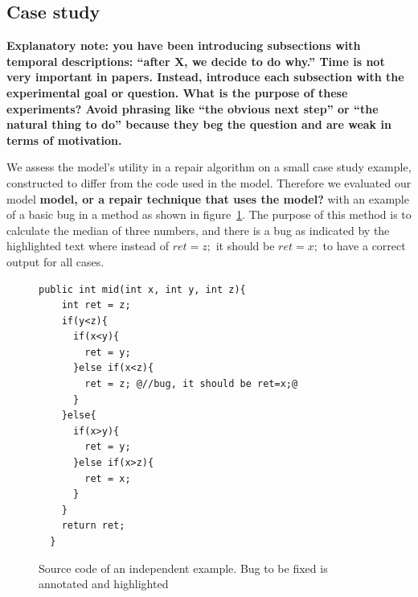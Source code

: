 \documentclass[conference]{IEEEtran}
\newcommand{\todo}[1]
  {{\scriptsize \textbf{\color{red} {#1}}}}
\begin{document}
{\subsection{Case study}
\label{sec:casestudy}

\todo{Explanatory note: you have been introducing subsections with temporal
  descriptions: ``after X, we decide to do why.''  Time is not very important in
  papers.  Instead, introduce each subsection with the experimental goal or
  question.  What is the purpose of these experiments?  Avoid phrasing like
  ``the obvious next step'' or ``the natural thing to do'' because they beg the
  question and are weak in terms of motivation.}

We assess the
model's utility in a repair algorithm on a small case study example, constructed
to differ from the code used in the model.  Therefore we evaluated our model
\todo{model, or a repair technique that uses the model?}
with an example of a basic bug in a method as shown in figure~\ref{fig:initialExample}. The purpose of this method is to calculate the median 
of three numbers, and there is a bug as indicated by the highlighted text where 
instead of $ret = z;$ it should be $ret = x;$ to have a correct output 
for all cases.


\begin{figure}[t]
\begin{lstlisting}[frame=single,style=base]
  public int mid(int x, int y, int z){
    int ret = z;  
    if(y<z){
      if(x<y){
        ret = y;
      }else if(x<z){
        ret = z; @//bug, it should be ret=x;@
      }
    }else{
      if(x>y){
        ret = y;
      }else if(x>z){
        ret = x;
      }
    }
    return ret;
  }	
	\end{lstlisting}
	\caption{Source code of an independent example. Bug to be fixed is annotated and highlighted}
	\label{fig:initialExample}
\end{figure}




}
\end{document}
